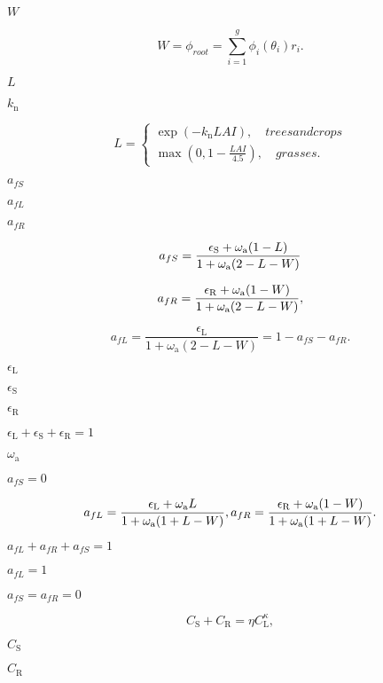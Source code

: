 \documentclass{article}
\begin{document}
$W$
\pagebreak

\[ \label{degsoilsat} W = \phi_{root} = \sum_{i=1}^g \phi_{i}(\theta_{i}) r_{i}. \]
\pagebreak

$L$
\pagebreak

$k_\mathrm{n}$
\pagebreak

\[ L = \begin{cases} \exp(-k_\mathrm{n} LAI), \quad trees and crops \\ \max\left(0,1-\frac{LAI}{4.5}\right),\quad grasses. \end{cases} \]
\pagebreak

$a_{fS}$
\pagebreak

$a_{fL}$
\pagebreak

$a_{fR}$
\pagebreak

\[ \label{As} a_{fS}=\frac{\epsilon_\mathrm{S}+\omega_\mathrm{a}(1-L)}{1+\omega_\mathrm{a}(2-L-W)} \vspace*{-4mm} \]
\pagebreak

\[ \label{Ar} a_{fR}=\frac{\epsilon_\mathrm{R}+ \omega_\mathrm{a}(1-W)}{1+\omega_\mathrm{a}(2-L-W)}, \vspace*{-4mm}\]
\pagebreak

\[ \label{Al} a_{fL}=\frac{\epsilon_\mathrm{L}}{1+\omega_\mathrm{a}(2-L-W)}= 1-a_{fS}-a_{fR}. \]
\pagebreak

$\epsilon_\mathrm{L}$
\pagebreak

$\epsilon_\mathrm{S}$
\pagebreak

$\epsilon_\mathrm{R}$
\pagebreak

$\epsilon_\mathrm{L} + \epsilon_\mathrm{S} + \epsilon_\mathrm{R} = 1$
\pagebreak

$\omega_\mathrm{a}$
\pagebreak

$a_{fS}=0$
\pagebreak

\[ a_{fL}=\frac{\epsilon_\mathrm{L}+\omega_\mathrm{a} L}{1+\omega_\mathrm{a}(1+L-W)},\\ a_{fR}=\frac{\epsilon_\mathrm{R}+\omega_\mathrm{a}(1-W)}{1+\omega_\mathrm{a}(1+L-W)}.\]
\pagebreak

$a_{fL} + a_{fR} + a_{fS} = 1$
\pagebreak

$a_{fL} = 1$
\pagebreak

$a_{fS} = a_{fR} = 0$
\pagebreak

\[ \label{propwoody} C_\mathrm{S} + C_\mathrm{R} = \eta C_\mathrm{L}^{\kappa},\]
\pagebreak

$C_\mathrm{S}$
\pagebreak

$C_\mathrm{R}$
\pagebreak
\end{document}
